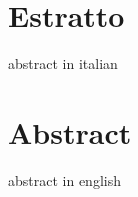 \thispagestyle{empty}

\chapter*{Estratto}
abstract in italian

\cleardoublepage

\thispagestyle{empty}

\chapter*{Abstract}
abstract in english

\cleardoublepage